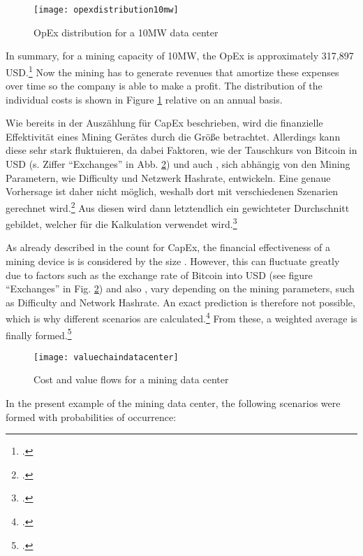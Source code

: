 \begin{figure}[H]
    \caption{OpEx distribution for a 10MW data center}
    \texttt{[image: opexdistribution10mw]}
    \label{figure:opexdistribution10mw}
\end{figure}

In summary, for a mining capacity of 10MW, the \ac{OpEx} is approximately 317,897 USD.\footcite[Cf.][]{appendix:opex}
Now the mining has to generate revenues that amortize these expenses over time
so the company is able to make a profit. The distribution of the individual costs
is shown in Figure \ref{figure:opexdistribution10mw} relative on an annual basis.

Wie bereits in der Auszählung für \ac{CapEx} beschrieben, wird die finanzielle Effektivität eines Mining Gerätes durch
die Größe \RM betrachtet. Allerdings kann diese sehr stark fluktuieren, da dabei Faktoren, wie der Tauschkurs von Bitcoin
in USD (s. Ziffer "`Exchanges"' in Abb. \ref{figure:valuechaindatacenter}) und auch \DP, sich abhängig von den Mining
Parametern, wie Difficulty und Netzwerk Hashrate, entwickeln. Eine genaue Vorhersage ist daher nicht möglich, weshalb dort
mit verschiedenen Szenarien gerechnet wird.\footcite[Cf.][]{appendix:s19proassumptions} Aus diesen wird dann letztendlich ein
gewichteter Durchschnitt gebildet, welcher für die Kalkulation verwendet wird.\footcite[Cf.][]{appendix:s19proassumptions}

As already described in the count for \ac{CapEx}, the financial effectiveness of a mining device is
is considered by the size \RM. However, this can fluctuate greatly due to factors such as the exchange rate of Bitcoin
into USD (see figure "`Exchanges"' in Fig. \ref{figure:valuechaindatacenter}) and also \DP, vary depending on the mining
parameters, such as Difficulty and Network Hashrate. An exact prediction is therefore not possible, which is why
different scenarios are calculated.\footcite[Cf.][]{appendix:s19proassumptions} From these, a weighted average is finally formed.\footcite[Cf.][]{appendix:s19proassumptions}

\begin{figure}[H]
    \caption{Cost and value flows for a mining data center}
    \texttt{[image: valuechaindatacenter]}
    \label{figure:valuechaindatacenter}
    \\
    \cite[Source: Based on][Fig. 3]{derks2018chaining}
\end{figure}

In the present example of the mining data center, the following scenarios were formed with probabilities of occurrence:

